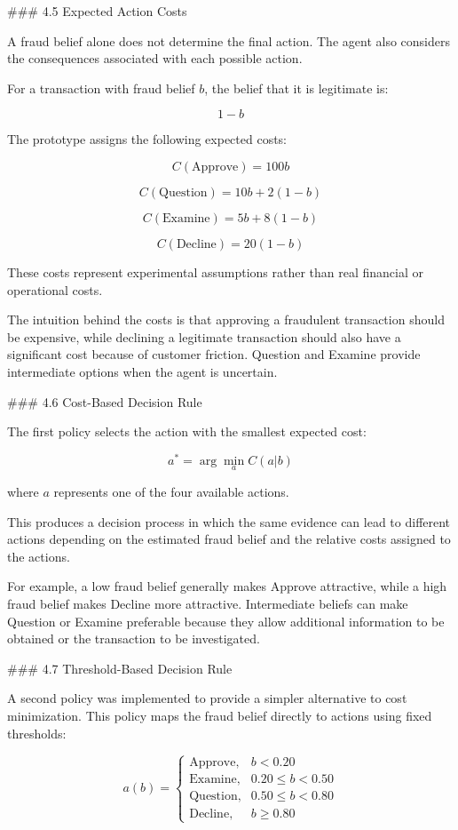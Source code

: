 ### 4.5 Expected Action Costs

A fraud belief alone does not determine the final action. The agent also considers the consequences associated with each possible action.

For a transaction with fraud belief \(b\), the belief that it is legitimate is:

$$
1-b
$$

The prototype assigns the following expected costs:

$$
C(\text{Approve}) = 100b
$$

$$
C(\text{Question}) = 10b + 2(1-b)
$$

$$
C(\text{Examine}) = 5b + 8(1-b)
$$

$$
C(\text{Decline}) = 20(1-b)
$$

These costs represent experimental assumptions rather than real financial or operational costs.

The intuition behind the costs is that approving a fraudulent transaction should be expensive, while declining a legitimate transaction should also have a significant cost because of customer friction. Question and Examine provide intermediate options when the agent is uncertain.

### 4.6 Cost-Based Decision Rule

The first policy selects the action with the smallest expected cost:

$$
a^* = \arg\min_a C(a|b)
$$

where \(a\) represents one of the four available actions.

This produces a decision process in which the same evidence can lead to different actions depending on the estimated fraud belief and the relative costs assigned to the actions.

For example, a low fraud belief generally makes Approve attractive, while a high fraud belief makes Decline more attractive. Intermediate beliefs can make Question or Examine preferable because they allow additional information to be obtained or the transaction to be investigated.

### 4.7 Threshold-Based Decision Rule

A second policy was implemented to provide a simpler alternative to cost minimization. This policy maps the fraud belief directly to actions using fixed thresholds:

$$
a(b)=
\begin{cases}
\text{Approve}, & b < 0.20\\
\text{Examine}, & 0.20 \leq b < 0.50\\
\text{Question}, & 0.50 \leq b < 0.80\\
\text{Decline}, & b \geq 0.80
\end{cases}
$$

